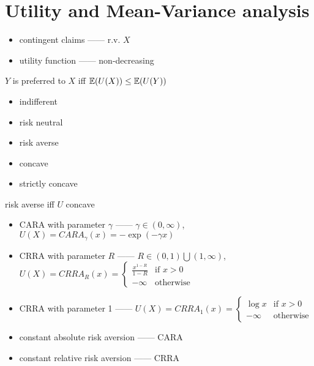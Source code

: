 \section{Utility and Mean-Variance analysis}\label{sec:utility-and-mean-variance-analysis}

\begin{itemize}
    \item contingent claims ------ r.v. $X$
    \item utility function ------ non-decreasing
\end{itemize}

\begin{fact}
    $Y$ is preferred to $X$ iff $\mathbb{E}(U(X)) \leq \mathbb{E}(U(Y))$
\end{fact}

\begin{itemize}
    \item indifferent
    \item risk neutral
    \item risk averse
    \item concave
    \item strictly concave
\end{itemize}

\begin{prop}
    risk averse iff $U$ concave
\end{prop}

\begin{itemize}
    \item CARA with parameter $\gamma$ ------ $\gamma \in (0, \infty)$, $U(X) = CARA_\gamma(x) = -\exp(-\gamma x)$
    \item CRRA with parameter $R$ ------ $R \in (0,1) \bigcup (1, \infty)$, $U(X) = CRRA_R(x) = \begin{cases}
                                              \frac{x^{1-R}}{1-R} & \text{if } x > 0\\
                                              -\infty & \text{otherwise}
    \end{cases}$
    \item CRRA with parameter 1 ------  $U(X) = CRRA_1(x) = \begin{cases}
                                              \log x & \text{if } x > 0\\
                                              -\infty & \text{otherwise}
    \end{cases}$
    \item constant absolute risk aversion ------ CARA
    \item constant relative risk aversion ------ CRRA
\end{itemize}

